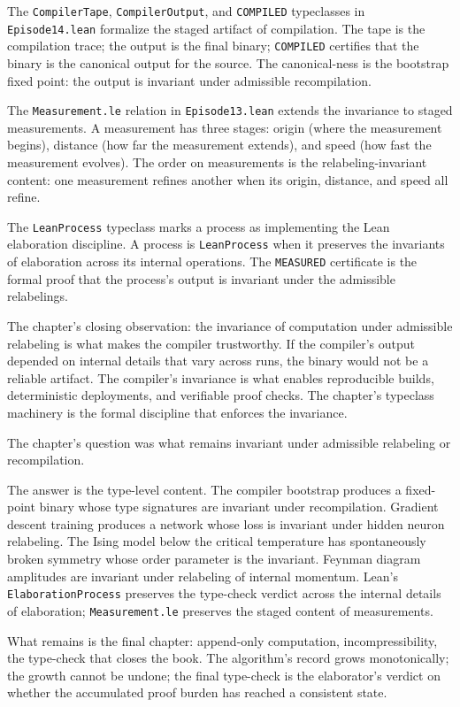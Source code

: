 The \texttt{CompilerTape}, \texttt{CompilerOutput}, and
\texttt{COMPILED} typeclasses in \texttt{Episode14.lean} formalize
the staged artifact of compilation. The tape is the compilation
trace; the output is the final binary; \texttt{COMPILED} certifies
that the binary is the canonical output for the source. The
canonical-ness is the bootstrap fixed point: the output is
invariant under admissible recompilation.

The \texttt{Measurement.le} relation in \texttt{Episode13.lean}
extends the invariance to staged measurements. A measurement has
three stages: origin (where the measurement begins), distance
(how far the measurement extends), and speed (how fast the
measurement evolves). The order on measurements is the
relabeling-invariant content: one measurement refines another
when its origin, distance, and speed all refine.

The \texttt{LeanProcess} typeclass marks a process as
implementing the Lean elaboration discipline. A process is
\texttt{LeanProcess} when it preserves the invariants of
elaboration across its internal operations. The
\texttt{MEASURED} certificate is the formal proof that the
process's output is invariant under the admissible
relabelings.

The chapter's closing observation: the invariance of computation
under admissible relabeling is what makes the compiler
trustworthy. If the compiler's output depended on internal
details that vary across runs, the binary would not be a
reliable artifact. The compiler's invariance is what enables
reproducible builds, deterministic deployments, and verifiable
proof checks. The chapter's typeclass machinery is the formal
discipline that enforces the invariance.

\begin{bridge}

The chapter's question was what remains invariant under admissible
relabeling or recompilation.

The answer is the type-level content. The compiler bootstrap produces
a fixed-point binary whose type signatures are invariant under
recompilation. Gradient descent training produces a network whose
loss is invariant under hidden neuron relabeling. The Ising model
below the critical temperature has spontaneously broken symmetry
whose order parameter is the invariant. Feynman diagram amplitudes
are invariant under relabeling of internal momentum. Lean's
\texttt{ElaborationProcess} preserves the type-check verdict
across the internal details of elaboration; \texttt{Measurement.le}
preserves the staged content of measurements.

What remains is the final chapter: append-only computation,
incompressibility, the type-check that closes the book. The
algorithm's record grows monotonically; the growth cannot be undone;
the final type-check is the elaborator's verdict on whether the
accumulated proof burden has reached a consistent state.

\end{bridge}

